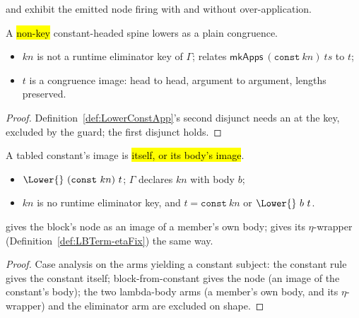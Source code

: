 \begin{remark}
  and  exhibit the emitted
node firing with and without over-application.
\end{remark}

\begin{lemma}
\label{lem:Lower-source_constSpine}
\leanok
{}
 A \hl{non-key} constant-headed spine lowers as a plain congruence.
\begin{itemize}
\item {} $kn$ is not a runtime eliminator key of $\Gamma$; \Lower{} relates
$\mathsf{mkApps}\ (\mathtt{const}\ kn)\ ts$ to $t$;
\item {} $t$ is a congruence image: head to head, argument to argument, lengths preserved.
\end{itemize}
\end{lemma}
\begin{proof}
\leanok
{}
 Definition~\ref{def:LowerConstApp}'s second disjunct needs an  at the key,
excluded by the guard; the first disjunct holds.
\end{proof}

\begin{lemma}
\label{lem:Lower-const_body}
\leanok
{}
 A tabled constant's image is \hl{itself, or its body's image}.
\begin{itemize}
\item {} $\Lower{}\ (\mathtt{const}\ kn)\ t$; $\Gamma$ declares $kn$ with body $b$;
\item {} $kn$ is no runtime eliminator key, and $t = \mathtt{const}\ kn$ or $\Lower{}\ b\ t$.
\end{itemize}
  gives the block's  node as an image of a member's
own body;  gives its $\eta$-wrapper (Definition~\ref{def:LBTerm-etaFix})
the same way.
\end{lemma}
\begin{proof}
\leanok
{}
 Case analysis on the \Lower{} arms yielding a constant subject: the constant rule gives the
constant itself; block-from-constant gives the  node (an image of the constant's body); the two
lambda-body arms (a member's own body, and its $\eta$-wrapper) and the eliminator arm are excluded on
shape.
\end{proof}

